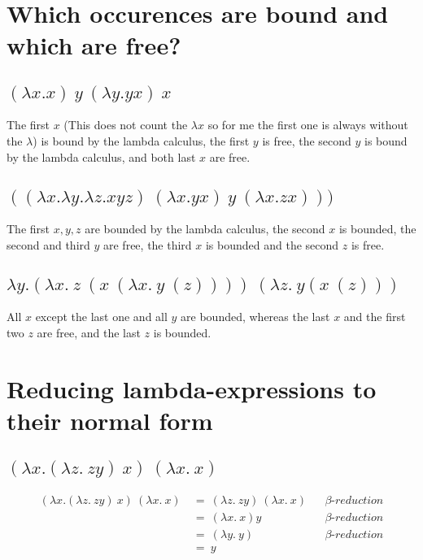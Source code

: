 \documentclass{report}
\begin{document}
	\section{Which occurences are bound and which are free?}
	\startsection
		\subsection{$(\lambda x.x) \ y \ (\lambda y.yx ) \ x$}
		\startsection
			The first $x$ (This does not count the $\lambda x$ so for me the first one is always without the $\lambda$) is bound by the lambda calculus, the first $y$ is free, the second $y$ is bound by the lambda calculus, and both last $x$ are free.
		\closesection
		\subsection{$((\lambda x . \lambda y . \lambda z.xyz) \ (\lambda x.yx) \ y \ (\lambda x.zx)))$}
		\startsection
			The first $x,y,z$ are bounded by the lambda calculus, the second $x$ is bounded, the second and third $y$ are free, the third $x$ is bounded and the second $z$ is free.
		\closesection
		\subsection{$\lambda y.(\lambda x . \ z \ (x \ (\lambda x . \ y \ (z)))) \ (\lambda z. \ y (x \ (z)))$}
		\startsection
			All $x$ except the last one and all $y$ are bounded, whereas the last $x$ and the first two $z$ are free, and the last $z$ is bounded.
		\closesection
	\closesection
	
	\section{Reducing lambda-expressions to their normal form}
	\startsection
		\subsection{$(\lambda x . (\lambda z. \ zy) \ x) \ (\lambda x. \ x)$}
		\startsection
			\begin{align*}
				(\lambda x . (\lambda z. \ zy) \ x) \ (\lambda x. \ x) \ & = \ (\lambda z. \ zy) \ (\lambda x. \ x) && \beta \textit{-reduction} \\
				& = \ (\lambda x . \ x)y && \beta \textit{-reduction} \\
				& = \ (\lambda y . \ y) && \beta \textit{-reduction} \\
				& = \ y
			\end{align*}
		\closesection
\end{document}
